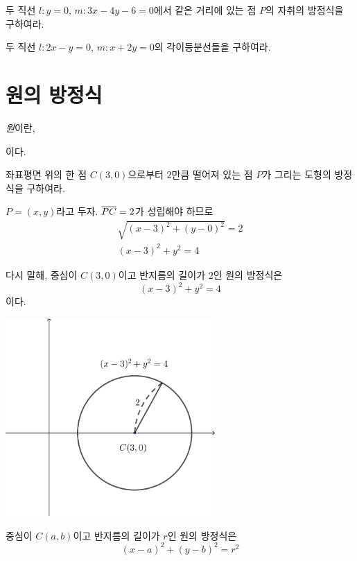 \documentclass{oblivoir}
\begin{document}
%
\prob{}\label{trace9}
두 직선 \(l:y=0\), \(m:3x-4y-6=0\)에서 같은 거리에 있는 점 \(P\)의 자취의 방정식을 구하여라.

%
\prob{}\label{trace10}
두 직선 \(l:2x-y=0\), \(m:x+2y=0\)의 각이등분선들을 구하여라.

\section{원의 방정식}

\emph{원}이란, 
\begin{center}
\end{center}
이다.

%
\exam{}\label{circle1}
좌표평면 위의 한 점 \(C(3,0)\)으로부터 \(2\)만큼 떨어져 있는 점 \(P\)가 그리는 도형의 방정식을 구하여라.
\begin{mdframed}
\(P=(x,y)\)라고 두자.
\(\overline{PC}=2\)가 성립해야 하므로
\begin{gather*}
\sqrt{(x-3)^2+(y-0)^2}=2\\
(x-3)^2+y^2=4
\end{gather*}
\end{mdframed}
다시 말해, 중심이 \(C(3,0)\)이고 반지름의 길이가 \(2\)인 원의 방정식은
\[(x-3)^2+y^2=4\]
이다.
\begin{center}
\includegraphics[width=0.6\textwidth]{c_1}
\end{center}

\begin{mdframed}
%
\label{circle2}
중심이 \(C(a,b)\)이고 반지름의 길이가 \(r\)인 원의 방정식은
\[(x-a)^2+(y-b)^2=r^2\]
\end{mdframed}
\end{document}
